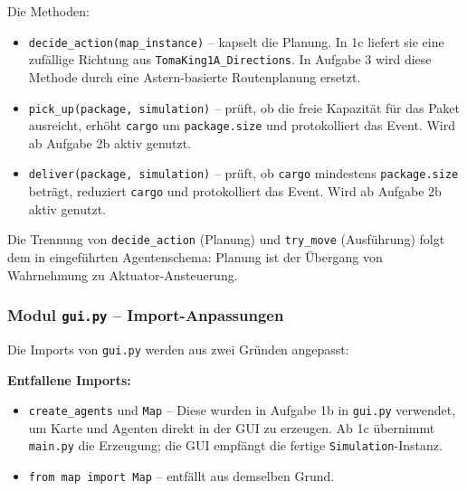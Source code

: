 Die Methoden:
\begin{itemize}
    \item \texttt{decide\_action(map\_instance)} – kapselt die Planung. In 1c liefert sie eine zufällige Richtung aus \texttt{TomaKing1A\_Directions}. In Aufgabe 3 wird diese Methode durch eine \acs{Astern}-basierte Routenplanung ersetzt.
    \item \texttt{pick\_up(package, simulation)} – prüft, ob die freie Kapazität für das Paket ausreicht, erhöht \texttt{cargo} um \texttt{package.size} und protokolliert das Event. Wird ab Aufgabe 2b aktiv genutzt.
    \item \texttt{deliver(package, simulation)} – prüft, ob \texttt{cargo} mindestens \texttt{package.size} beträgt, reduziert \texttt{cargo} und protokolliert das Event. Wird ab Aufgabe 2b aktiv genutzt.
\end{itemize}

Die Trennung von \texttt{decide\_action} (Planung) und \texttt{try\_move} (Ausführung) folgt dem in \textcite[S. 14]{5} eingeführten Agentenschema: Planung ist der Übergang von Wahrnehmung zu Aktuator-Ansteuerung.


\subsubsection{Modul \texttt{gui.py} – Import-Anpassungen}

Die Imports von \texttt{gui.py} werden aus zwei Gründen angepasst:





\textbf{Entfallene Imports:}
\begin{itemize}
    \item \texttt{create\_agents} und \texttt{Map} – Diese wurden in Aufgabe 1b in \texttt{gui.py} verwendet, um Karte und Agenten direkt in der \acs{GUI} zu erzeugen. Ab 1c übernimmt \texttt{main.py} die Erzeugung; die \acs{GUI} empfängt die fertige \texttt{Simulation}-Instanz.
    \item \texttt{from map import Map} – entfällt aus demselben Grund.
\end{itemize}

